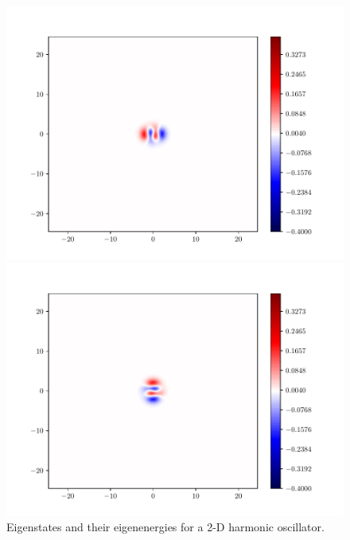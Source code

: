 \documentclass{article}
\begin{document}
\begin{enumerate}[1.]
\begin{enumerate}[(A)]
\begin{enumerate}[(i)]
\begin{figure}[H]
\begin{minipage}{0.3\linewidth}
          \includegraphics[width=\linewidth]{functions-8.pdf}
          \caption*{$E = 4.000000000003303136$}
        \end{minipage}

        \begin{minipage}{0.3\linewidth}
          \centering
          \includegraphics[width=\linewidth]{functions-9.pdf}
          \caption*{$E = 4.000000000003453238$}
        \end{minipage}
        \caption{Eigenstates and their eigenenergies for a 2-D harmonic oscillator.}
        \label{fig:q6c-2}
      \end{figure}


\end{enumerate}
\end{enumerate}
\end{enumerate}
\end{document}
